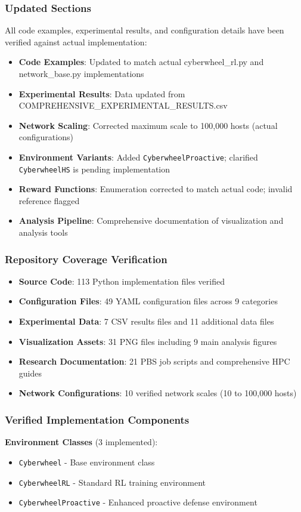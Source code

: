 \documentclass[12pt,a4paper]{article}
\begin{document}
\subsubsection{Updated Sections}
All code examples, experimental results, and configuration details have been verified against actual implementation:

\begin{itemize}
    \item \textbf{Code Examples}: Updated to match actual cyberwheel\_rl.py and network\_base.py implementations
    \item \textbf{Experimental Results}: Data updated from COMPREHENSIVE\_EXPERIMENTAL\_RESULTS.csv
    \item \textbf{Network Scaling}: Corrected maximum scale to 100,000 hosts (actual configurations)
    \item \textbf{Environment Variants}: Added \texttt{CyberwheelProactive}; clarified \texttt{CyberwheelHS} is pending implementation
    \item \textbf{Reward Functions}: Enumeration corrected to match actual code; invalid reference flagged
    \item \textbf{Analysis Pipeline}: Comprehensive documentation of visualization and analysis tools
\end{itemize}

\subsubsection{Repository Coverage Verification}
\begin{itemize}
    \item \textbf{Source Code}: 113 Python implementation files verified
    \item \textbf{Configuration Files}: 49 YAML configuration files across 9 categories
    \item \textbf{Experimental Data}: 7 CSV results files and 11 additional data files
    \item \textbf{Visualization Assets}: 31 PNG files including 9 main analysis figures
    \item \textbf{Research Documentation}: 21 PBS job scripts and comprehensive HPC guides
    \item \textbf{Network Configurations}: 10 verified network scales (10 to 100,000 hosts)
\end{itemize}

\subsubsection{Verified Implementation Components}
\textbf{Environment Classes} (3 implemented):
\begin{itemize}
    \item \texttt{Cyberwheel} - Base environment class
    \item \texttt{CyberwheelRL} - Standard RL training environment
    \item \texttt{CyberwheelProactive} - Enhanced proactive defense environment
\end{itemize}
\end{document}
